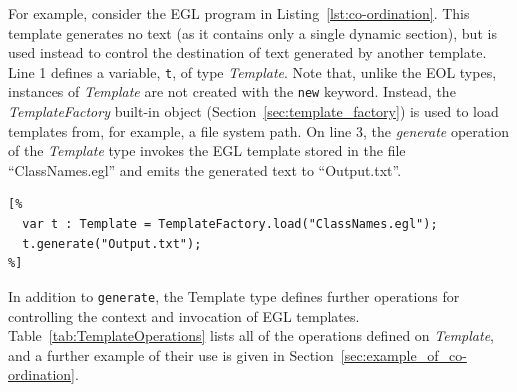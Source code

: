 For example, consider the EGL program in Listing~\ref{lst:co-ordination}.
This template generates no text (as it contains only a single dynamic section),
but is used instead to control the destination of text generated by another
template. Line 1 defines a variable, \texttt{t}, of type \emph{Template}. 
Note that, unlike the EOL types, instances of \emph{Template} are not created
with the \texttt{new} keyword. Instead, the \emph{TemplateFactory} built-in
object (Section~\ref{sec:template_factory}) is used to load templates from, 
for example, a file system path. On line 3, the \emph{generate} operation 
of the \emph{Template} type invokes the EGL template
stored in the file ``ClassNames.egl'' and emits the generated text to 
``Output.txt''.

\begin{lstlisting}[float=tbp, caption=Storing the name of each Class to disk., label=lst:co-ordination, language=EGL]
[%
  var t : Template = TemplateFactory.load("ClassNames.egl");
  t.generate("Output.txt");
%]
\end{lstlisting}

In addition to \texttt{generate}, the Template type defines further operations for controlling the context and invocation of EGL templates. Table~\ref{tab:TemplateOperations} lists all of the operations defined on \emph{Template}, and a further example of their use is given in Section~\ref{sec:example_of_co-ordination}.

